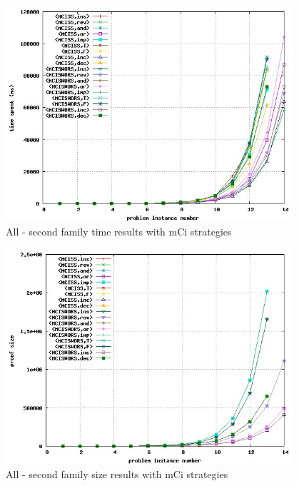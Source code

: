 \documentclass[a4paper,10pt]{book}
\newcommand{\mci}{mCi}
\begin{document}
\begin{figure}[!htbp]
\begin{center}
\includegraphics[width=0.95\textwidth]{../mci_2_a.jpg}
\end{center}
\caption{All - second family time results with \mci\/ strategies}
\end{figure}

\begin{figure}[!htbp]
\begin{center}
\includegraphics[width=0.95\textwidth]{../mci_2_b.jpg}
\end{center}
\caption{All - second family size results with \mci\/ strategies}
\end{figure}
\end{document}
